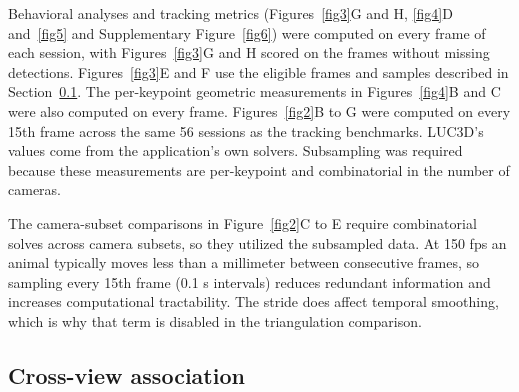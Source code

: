 \documentclass[pdflatex, sn-nature]{sn-jnl}
\theoremstyle{thmstyleone}%
\theoremstyle{thmstyletwo}%
\theoremstyle{thmstylethree}%
\begin{document}
Behavioral analyses and tracking metrics (Figures~\ref{fig3}G and H, \ref{fig4}D and~\ref{fig5} and Supplementary Figure~\ref{fig6}) were computed on every frame of each session, with Figures~\ref{fig3}G and H scored on the frames without missing detections. Figures~\ref{fig3}E and F use the eligible frames and samples described in Section~\ref{methods-association}. The per-keypoint geometric measurements in Figures~\ref{fig4}B and C were also computed on every frame. Figures~\ref{fig2}B to G were computed on every 15th frame across the same 56 sessions as the tracking benchmarks. LUC3D's values come from the application's own solvers. Subsampling was required because these measurements are per-keypoint and combinatorial in the number of cameras.

The camera-subset comparisons in Figure~\ref{fig2}C to E require combinatorial solves across camera subsets, so they utilized the subsampled data. At 150 fps an animal typically moves less than a millimeter between consecutive frames, so sampling every 15th frame (0.1 s intervals) reduces redundant information and increases computational tractability. The stride does affect temporal smoothing, which is why that term is disabled in the triangulation comparison.

\subsection{Cross-view association}\label{methods-association}
\end{document}
